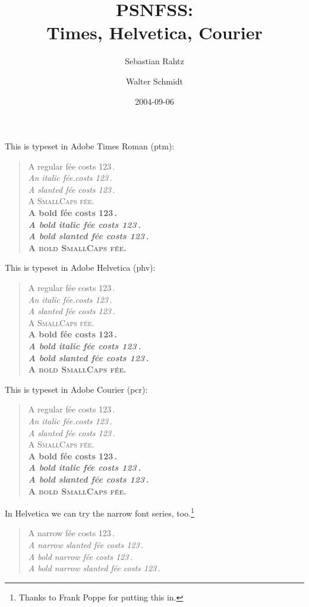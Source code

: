 \documentclass[11pt]{article}
\begin{document}
\frenchspacing
\title{PSNFSS:\\ Times, Helvetica, Courier}
\author{Sebastian Rahtz \and Walter Schmidt}
\date{2004-09-06}
\maketitle
\def\Try#1#2{%
{\fontfamily{#1}\selectfont
This is typeset in #2 (#1):
\begin{quote}
\raggedright
A regular f\'ee costs 123\,\texteuro.\\
\textit{An italic f\'ee.costs 123\,\texteuro.}\\
\textsl{A slanted f\'ee costs 123\,\texteuro.}\\
\textsc{A SmallCaps f\'ee.}\\
{\bfseries A bold f\'ee costs 123\,\texteuro.\\
 \textit{A bold italic f\'ee costs 123\,\texteuro.}\\
 \textsl{A bold slanted f\'ee costs 123\,\texteuro.}\\
 \textsc{A bold SmallCaps f\'ee.}\\
}
\end{quote}
\par
}}

\Try{ptm}{Adobe Times Roman}
\Try{phv}{Adobe Helvetica}
\Try{pcr}{Adobe Courier}

\textsf{In Helvetica we can try the narrow font series, too.\footnote{Thanks to Frank
  Poppe for putting this in.}}
\begin{quote}
\raggedright
{}\selectfont
\upshape A narrow f\'ee costs 123\,\texteuro.\\
\slshape A narrow slanted f\'ee costs 123\,\texteuro.\\
{\selectfont
\upshape A bold narrow f\'ee costs 123\,\texteuro.\\
\slshape A bold narrow slanted f\'ee costs 123\,\texteuro.
}
\end{quote}
\end{document}
